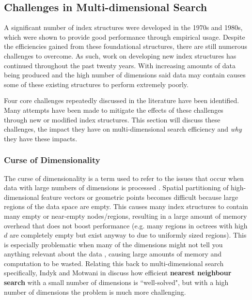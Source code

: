 \subsection{Challenges in Multi-dimensional Search}
\label{sec:challenges}

A significant number of index structures were developed in the 1970s and 1980s, which were shown to provide good performance through empirical usage. Despite the efficiencies gained from these foundational structures, there are still numerous challenges to overcome. As such, work on developing new index structures has continued throughout the past twenty years. With increasing amounts of data being produced and the high number of dimensions said data may contain causes some of these existing structures to perform extremely poorly.

Four core challenges repeatedly discussed in the literature have been identified. Many attempts have been made to mitigate the effects of these challenges through new or modified index structures. This section will discuss these challenges, the impact they have on multi-dimensional search efficiency and \textit{why} they have these impacts.

\subsubsection{Curse of Dimensionality}
\label{sec:curse-of-dimensionality}

The curse of dimensionality is a term used to refer to the issues that occur when data with large numbers of dimensions is processed \cite{curse-of-dimensionality}. Spatial partitioning of high-dimensional feature vectors or geometric points becomes difficult because large regions of the data space are empty. This causes many index structures to contain many empty or near-empty nodes/regions, resulting in a large amount of memory overhead that does not boost performance (e.g. many regions in octrees with high $d$ are completely empty but exist anyway to due to uniformly sized regions). This is especially problematic when many of the dimensions might not tell you anything relevant about the data \cite{irrelevant-dimension}, causing large amounts of memory and computation to be wasted. Relating this back to multi-dimensional search specifically, Indyk and Motwani in \cite{knn-curse-of-dimensionality} discuss how efficient \textbf{nearest neighbour search} with a small number of dimensions is ``well-solved", but with a high number of dimensions the problem is much more challenging.

